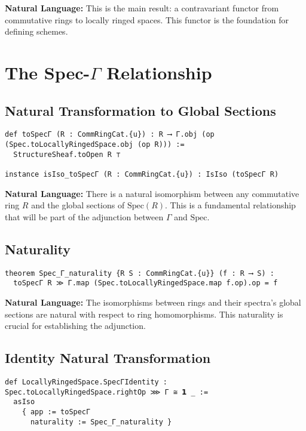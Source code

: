 \documentclass{article}
\theoremstyle{definition}
\begin{document}
\textbf{Natural Language:} This is the main result: a contravariant functor from commutative rings to locally ringed spaces. This functor is the foundation for defining schemes.

\section{The Spec-$\Gamma$ Relationship}

\subsection{Natural Transformation to Global Sections}

\begin{lstlisting}
def toSpecΓ (R : CommRingCat.{u}) : R ⟶ Γ.obj (op (Spec.toLocallyRingedSpace.obj (op R))) :=
  StructureSheaf.toOpen R ⊤

instance isIso_toSpecΓ (R : CommRingCat.{u}) : IsIso (toSpecΓ R)
\end{lstlisting}

\textbf{Natural Language:} There is a natural isomorphism between any commutative ring $R$ and the global sections of $\mathrm{Spec}(R)$. This is a fundamental relationship that will be part of the adjunction between $\Gamma$ and $\mathrm{Spec}$.

\subsection{Naturality}

\begin{lstlisting}
theorem Spec_Γ_naturality {R S : CommRingCat.{u}} (f : R ⟶ S) :
  toSpecΓ R ≫ Γ.map (Spec.toLocallyRingedSpace.map f.op).op = f
\end{lstlisting}

\textbf{Natural Language:} The isomorphisms between rings and their spectra's global sections are natural with respect to ring homomorphisms. This naturality is crucial for establishing the adjunction.

\subsection{Identity Natural Transformation}

\begin{lstlisting}
def LocallyRingedSpace.SpecΓIdentity : Spec.toLocallyRingedSpace.rightOp ⋙ Γ ≅ 𝟭 _ :=
  asIso
    { app := toSpecΓ
      naturality := Spec_Γ_naturality }
\end{lstlisting}
\end{document}

